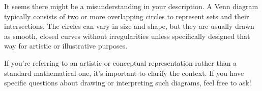 It seems there might be a misunderstanding in your description. A Venn diagram typically consists of two or more overlapping circles to represent sets and their intersections. The circles can vary in size and shape, but they are usually drawn as smooth, closed curves without irregularities unless specifically designed that way for artistic or illustrative purposes.

If you're referring to an artistic or conceptual representation rather than a standard mathematical one, it's important to clarify the context. If you have specific questions about drawing or interpreting such diagrams, feel free to ask!